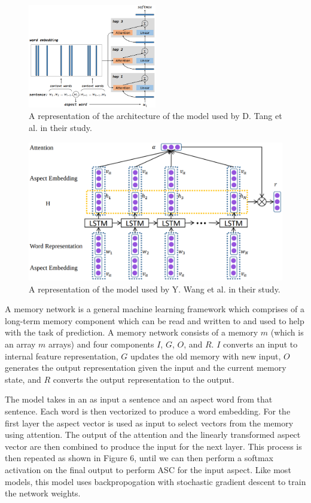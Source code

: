 \documentclass[conference]{IEEEtran}
\begin{document}
\begin{figure}[htbp]
\centerline{\includegraphics[keepaspectratio, width=0.5\textwidth]{pics/6.png}}
\caption{A representation of the architecture of the model used by D. Tang et al. in their study.}
\label{fig}
\end{figure}

\begin{figure}
\centerline{\includegraphics[keepaspectratio, width=\textwidth]{pics/7.png}}
  \caption{A representation of the model used by Y. Wang et al. in their study.}
\end{figure}

A memory network is a general machine learning framework which comprises of a long-term memory component which can be read and written to and used to help with the task of prediction. A memory network consists of a memory $m$ (which is an array $m$ arrays) and four components $I$, $G$, $O$, and $R$. $I$ converts an input to internal feature representation, $G$ updates the old memory with new input, $O$ generates the output representation given the input and the current memory state, and $R$ converts the output representation to the output.

The model takes in an as input a sentence and an aspect word from that sentence. Each word is then vectorized to produce a word embedding. For the first layer the aspect vector is used as input to select vectors from the memory using attention. The output of the attention and the linearly transformed aspect vector are then combined to produce the input for the next layer. This process is then repeated as shown in Figure 6, until we can then perform a softmax activation on the final output to perform ASC for the input aspect. Like most models, this model uses backpropogation with stochastic gradient descent to train the network weights.
\end{document}
